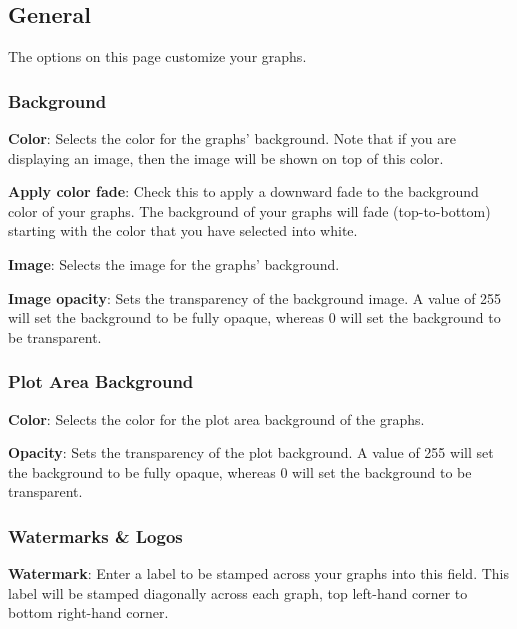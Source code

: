 \documentclass[
]{book}
\theoremstyle{definition}
\theoremstyle{definition}
\theoremstyle{definition}
\theoremstyle{definition}
\theoremstyle{remark}
\begin{document}
\hypertarget{general-1}{%
\subsection*{General}\label{general-1}}

The options on this page customize your graphs.

\hypertarget{background}{%
\subsubsection*{Background}\label{background}}

\textbf{Color}: Selects the color for the graphs' background. Note that if you are displaying an image, then the image will be shown on top of this color.

\textbf{Apply color fade}: Check this to apply a downward fade to the background color of your graphs. The background of your graphs will fade (top-to-bottom) starting with the color that you have selected into white.

\textbf{Image}: Selects the image for the graphs' background.

\textbf{Image opacity}: Sets the transparency of the background image. A value of 255 will set the background to be fully opaque, whereas 0 will set the background to be transparent.

\hypertarget{plot-area-background}{%
\subsubsection*{Plot Area Background}\label{plot-area-background}}

\textbf{Color}: Selects the color for the plot area background of the graphs.

\textbf{Opacity}: Sets the transparency of the plot background. A value of 255 will set the background to be fully opaque, whereas 0 will set the background to be transparent.

\hypertarget{watermark-and-logo}{%
\subsubsection*{Watermarks \& Logos}\label{watermark-and-logo}}

\textbf{Watermark}: Enter a label to be stamped across your graphs into this field. This label will be stamped diagonally across each graph, top left-hand corner to bottom right-hand corner.
\end{document}
